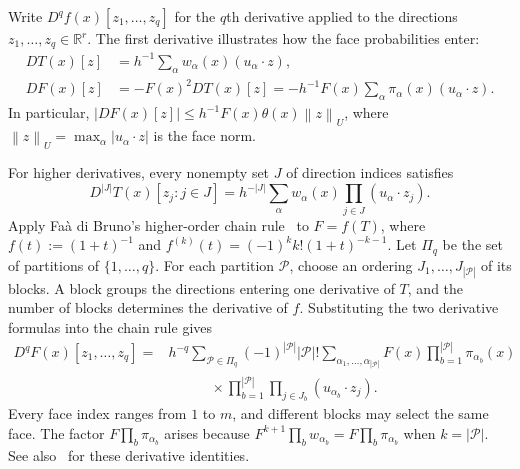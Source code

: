 \documentclass[11pt,letterpaper]{article}
\theoremstyle{remark}
\newcommand{\R}{\mathbb R}
\newcommand{\norm}[1]{\left\lVert#1\right\rVert}
\begin{document}
Write $D^qf(x)[z_1,\ldots,z_q]$ for the $q$th derivative applied
to the directions $z_1,\ldots,z_q\in\R^r$. The first derivative
illustrates how the face probabilities enter:
\[
 \begin{aligned}
 DT(x)[z]&=h^{-1}\sum_\alpha
              w_\alpha(x)(u_\alpha\cdot z),\\
 DF(x)[z]&=-F(x)^2DT(x)[z]
          =-h^{-1}F(x)\sum_\alpha
              \pi_\alpha(x)(u_\alpha\cdot z).
 \end{aligned}
\]
In particular, $|DF(x)[z]|\le h^{-1}F(x)\theta(x)\norm z_U$,
where $\norm z_U=\max_\alpha|u_\alpha\cdot z|$ is the face norm.

For higher derivatives, every nonempty set $J$ of direction indices
satisfies
\[
 D^{|J|}T(x)[z_j:j\in J]
 =h^{-|J|}\sum_\alpha w_\alpha(x)
                      \prod_{j\in J}(u_\alpha\cdot z_j).
\]
Apply Fa\`a di Bruno's higher-order chain rule~\cite{Comtet1974} to
$F=f(T)$, where $f(t):=(1+t)^{-1}$ and
$f^{(k)}(t)=(-1)^k k!(1+t)^{-k-1}$.
Let $\Pi_q$ be the set of partitions of $\{1,\ldots,q\}$.
For each partition $\mathcal P$, choose an ordering
$J_1,\ldots,J_{|\mathcal P|}$ of its blocks. A block groups the
directions entering one derivative of $T$, and the number of blocks
determines the derivative of $f$. Substituting the two derivative
formulas into the chain rule gives
\begin{equation}
 \begin{split}
 D^qF(x)[z_1,\ldots,z_q]
 ={}&h^{-q}\sum_{\mathcal P\in\Pi_q}(-1)^{|\mathcal P|}|\mathcal P|!
 \sum_{\alpha_1,\ldots,\alpha_{|\mathcal P|}}
 F(x)\prod_{b=1}^{|\mathcal P|}\pi_{\alpha_b}(x)\\
 &\hspace{3em}\times
 \prod_{b=1}^{|\mathcal P|}\prod_{j\in J_b}
 (u_{\alpha_b}\cdot z_j).
 \end{split}
 \label{appx-eq:partition-derivative}
\end{equation}
Every face index ranges from $1$ to $m$, and different blocks may
select the same face. The factor $F\prod_b\pi_{\alpha_b}$ arises
because $F^{k+1}\prod_b w_{\alpha_b}=F\prod_b\pi_{\alpha_b}$
when $k=|\mathcal P|$.
See also~\cite[Lemma~13]{GaoZhang} for these derivative identities.
\end{document}
